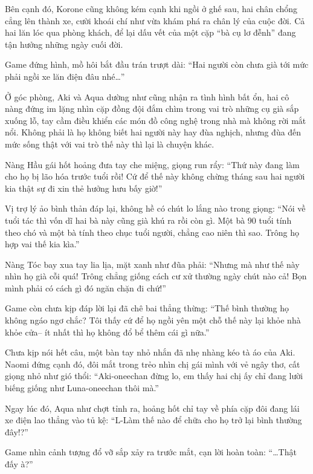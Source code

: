 \documentclass[../main.tex]{subfiles}
\begin{document}

Bên cạnh đó, Korone cũng không kém cạnh khi ngồi ở ghế sau, hai chân chổng cẳng lên thành xe, cười khoái chí như vừa khám phá ra chân lý của cuộc đời. Cả hai lăn lóc qua phòng khách, để lại dấu vết của một cặp ``bà cụ lơ đễnh'' đang tận hưởng những ngày cuối đời.

Game đứng hình, mồ hôi bắt đầu trán trượt dài: ``Hai người còn chưa già tới mức phải ngồi xe lăn điện đâu nhé\dots''

Ở góc phòng, Aki và Aqua dường như cũng nhận ra tình hình bất ổn, hai cô nàng đứng im lặng nhìn cặp đồng đội đắm chìm trong vai trò những cụ già sắp xuống lỗ, tay cầm điều khiển các món đồ công nghệ trong nhà mà không rời mắt nổi. Không phải là họ không biết hai người này hay đùa nghịch, nhưng đùa đến mức sống thật với vai trò thế này thì lại là chuyện khác.


Nàng Hầu gái hốt hoảng đưa tay che miệng, giọng run rẩy: ``Thứ này đang làm cho họ bị lão hóa trước tuổi rồi! Cứ để thế này không chừng tháng sau hai người kia thật sự đi xin thẻ hưởng hưu bấy giờ!''

Vị trợ lý ảo bình thản đáp lại, không hề có chút lo lắng nào trong giọng: ``Nói về tuổi tác thì vốn dĩ hai bà này cũng già khú ra rồi còn gì. Một bà 90 tuổi tính theo chó và một bà tính theo chục tuổi người, chẳng cao niên thì sao. Trông họ hợp vai thế kia kìa.''

Nàng Tóc bay xua tay lia lịa, mặt xanh như đũa phải: ``Nhưng mà như thế này nhìn họ già cỗi quá! Trông chẳng giống cách cư xử thường ngày chút nào cả! Bọn mình phải có cách gì đó ngăn chặn đi chứ!''

Game còn chưa kịp đáp lời lại đã chê bai thẳng thừng: ``Thế bình thường họ không ngáo ngơ chắc? Tôi thấy cứ để họ ngồi yên một chỗ thế này lại khỏe nhà khỏe cửa-- ít nhất thì họ không đổ bể thêm cái gì nữa.''

Chưa kịp nói hết câu, một bàn tay nhỏ nhắn đã nhẹ nhàng kéo tà áo của Aki. Naomi đứng cạnh đó, đôi mắt trong trẻo nhìn chị gái mình với vẻ ngây thơ, cất giọng nhỏ như gió thổi: ``Aki-oneechan đừng lo, em thấy hai chị ấy chỉ đang lười biếng giống như Luna-oneechan thôi mà.''

Ngay lúc đó, Aqua như chợt tỉnh ra, hoảng hốt chỉ tay về phía cặp đôi đang lái xe điện lao thẳng vào tủ kệ: ``L-Làm thế nào để chữa cho họ trở lại bình thường đây!?''

Game nhìn cảnh tượng đổ vỡ sắp xảy ra trước mắt, cạn lời hoàn toàn: ``\dots Thật đấy à?''
\end{document}
